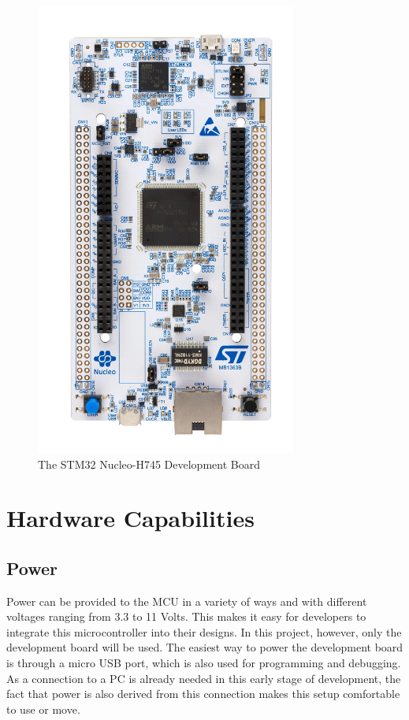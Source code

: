 \begin{figure}[!ht]
    \centering
    \includegraphics[height=150mm, keepaspectratio, angle=90]{figures/devboard.jpg}
    \caption{The STM32 Nucleo-H745 Development Board}
    \label{fig:Nucleo-H745}
\end{figure}

\section{Hardware Capabilities}

\subsection{Power}

Power can be provided to the MCU in a variety of ways and with different voltages ranging from 3.3 to 11 Volts. This makes it easy for developers to integrate this microcontroller into their designs. In this project, however, only the development board will be used. The easiest way to power the development board is through a micro USB port, which is also used for programming and debugging. As a connection to a PC is already needed in this early stage of development, the fact that power is also derived from this connection makes this setup comfortable to use or move.

